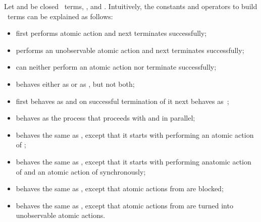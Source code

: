 \documentclass[fleqn]{llncs}
\begin{document}
Let  and  be closed \ACPt\ terms, , and
.
Intuitively, the constants and operators to build \ACPt\ terms can be
explained as follows:
\begin{itemize}
\item
 first performs atomic action  and next terminates successfully;
\item
 performs an unobservable atomic action and next terminates
successfully;
\item
 can neither perform an atomic action nor terminate successfully;
\item
 behaves either as  or as , but not both;
\item
 first behaves as  and on successful termination of 
it next behaves as~;
\item
 behaves as the process that proceeds with  and  in
parallel;
\item
 behaves the same as , except that it starts
with performing an atomic action of ;
\item
 behaves the same as , except that it starts with
performing an\linebreak[2] atomic action of  and an atomic action of
 synchronously;
\item
 behaves the same as , except that atomic actions from
 are blocked;
\item
 behaves the same as , except that atomic actions from
 are turned into unobservable atomic actions.
\end{itemize}
\begin{comment}
The operators  and  are of an auxiliary nature.
They are needed to axiomatize \ACPt.
\end{comment}
\end{document}
